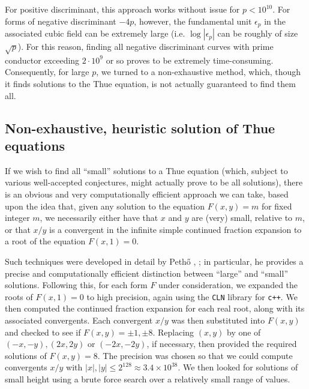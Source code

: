 For positive discriminant, this approach works without issue for $p < 10^{10}$. For forms of negative discriminant $-4p$, however, the fundamental unit $\epsilon_p$ in the associated cubic field can be extremely large (i.e. $\log |\epsilon_p|$ can be roughly of size  $\sqrt{p}$). For this reason, finding all negative discriminant curves with prime conductor exceeding $2 \cdot 10^9$ or so proves to be extremely time-consuming.
Consequently, for large $p$, we turned to a non-exhaustive method, which, 
though it finds solutions to the Thue equation, is not actually guaranteed to find them all.

\subsection{Non-exhaustive, heuristic solution of Thue equations}\label{ssec heuristic}
If we wish to find all ``small'' solutions to a Thue equation (which, subject to various well-accepted conjectures, might actually prove to be all solutions), there is an obvious and very  computationally efficient approach we can take, based upon the idea that, given any solution to the equation $F(x,y)=m$ for fixed integer $m$, we necessarily either have that $x$ and $y$ are (very) small, relative to $m$, or that $x/y$ is a convergent in the infinite simple continued fraction expansion to a root of the equation $F(x,1)=0$.

Such techniques were developed in detail by Peth\H{o} \cite{Pet1}, \cite{Pet2}; in particular, he provides a precise and computationally efficient distinction  between ``large'' and ``small'' solutions. Following this, for each form $F$ under consideration,
we expanded the roots of $F(x,1)=0$ to high precision, again using the 
\texttt{CLN} library for \texttt{c++}. We then computed the continued fraction expansion for each real root, 
along with its associated convergents. Each convergent $x/y$ was then substituted into $F(x,y)$ and  
checked to see if $F(x,y)=\pm 1, \pm 8$. Replacing $(x,y)$ by one of $(-x,-y), (2x,2y)$ or $(-2x,-2y)$, if necessary, then provided the required solutions of $F(x,y)=8$. The precision was chosen so that we could 
compute convergents $x/y$ with $|x|,|y| \leq 2^{128} \approx 3.4\times10^{38}$. We then looked for solutions of small height using a 
brute force search over a relatively small range of values. 

